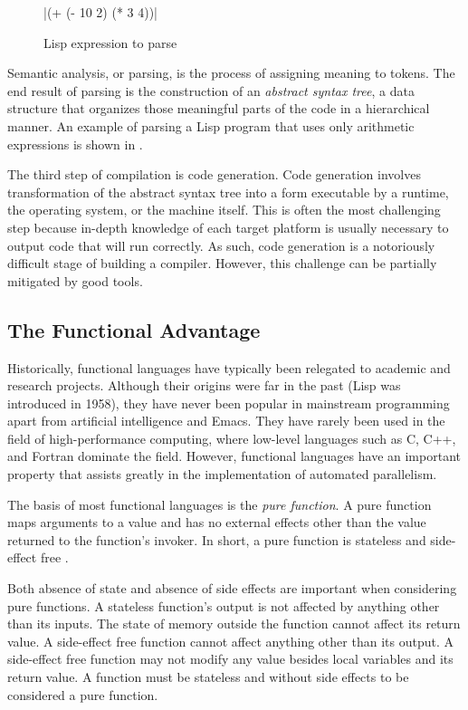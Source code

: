 \documentclass[abstracton]{scrartcl}
\begin{document}
\begin{figure}
  \centering
  \scheme|(+ (- 10 2) (* 3 4))|
  \caption{Lisp expression to parse}\label{fig:lisp-parsing}
\end{figure}

Semantic analysis, or parsing, is the process of assigning meaning to tokens. The end result of parsing is the construction of an \textit{abstract syntax tree}, a data structure that organizes those meaningful parts of the code in a hierarchical manner. An example of parsing a Lisp program that uses only arithmetic expressions is shown in .

The third step of compilation is code generation. Code generation involves transformation of the abstract syntax tree into a form executable by a runtime, the operating system, or the machine itself. This is often the most challenging step because in-depth knowledge of each target platform is usually necessary to output code that will run correctly. As such, code generation is a notoriously difficult stage of building a compiler. However, this challenge can be partially mitigated by good tools.

\subsection{The Functional Advantage}

Historically, functional languages have typically been relegated to academic and research projects. Although their origins were far in the past (Lisp was introduced in 1958), they have never been popular in mainstream programming apart from artificial intelligence and Emacs. They have rarely been used in the field of high-performance computing, where low-level languages such as C, C++, and Fortran dominate the field. However, functional languages have an important property that assists greatly in the implementation of automated parallelism.

The basis of most functional languages is the \emph{pure function}. A pure function maps arguments to a value and has no external effects other than the value returned to the function's invoker. In short, a pure function is stateless and side-effect free \autocite{10.1109/MCSE.2012.69}.

Both absence of state and absence of side effects are important when considering pure functions. A stateless function's output is not affected by anything other than its inputs. The state of memory outside the function cannot affect its return value. A side-effect free function cannot affect anything other than its output. A side-effect free function may not modify any value besides local variables and its return value. A function must be stateless and without side effects to be considered a pure function.
\end{document}
